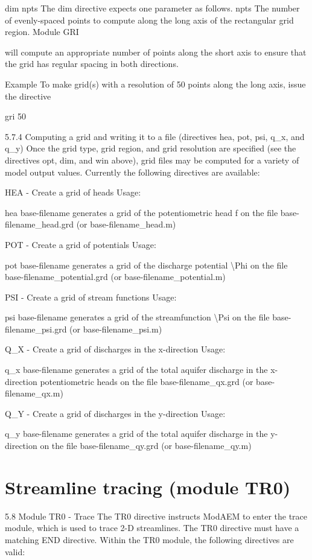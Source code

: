 dim npts The dim directive expects one parameter as follows. npts
The number of evenly-spaced points to compute along the long axis
of the rectangular grid region. Module GRI

will compute an appropriate number of points along the short axis
to ensure that the grid has regular spacing in both directions.

Example To make grid(s) with a resolution of 50 points along the long
axis, issue the directive

gri 50

5.7.4 Computing a grid and writing it to a file (directives hea, pot,
psi, q\_x, and q\_y) Once the grid type, grid region, and grid resolution
are specified (see the directives opt, dim, and win above), grid files
may be computed for a variety of model output values. Currently the
following directives are available:

HEA - Create a grid of heads Usage:

hea base-filename generates a grid of the potentiometric head f on
the file base-filename\_head.grd (or base-filename\_head.m)

POT - Create a grid of potentials Usage:

pot base-filename generates a grid of the discharge potential \textbackslash{}Phi
on the file base-filename\_potential.grd (or base-filename\_potential.m)

PSI - Create a grid of stream functions Usage:

psi base-filename generates a grid of the streamfunction \textbackslash{}Psi
on the file base-filename\_psi.grd (or base-filename\_psi.m)

Q\_X - Create a grid of discharges in the x-direction Usage:

q\_x base-filename generates a grid of the total aquifer discharge
in the x-direction potentiometric heads on the file base-filename\_qx.grd
(or base-filename\_qx.m)

Q\_Y - Create a grid of discharges in the y-direction Usage:

q\_y base-filename generates a grid of the total aquifer discharge
in the y-direction on the file base-filename\_qy.grd (or base-filename\_qy.m)


\section{Streamline tracing (module TR0)\label{sec:tr0-module}}

5.8 Module TR0 - Trace The TR0 directive instructs ModAEM to enter
the trace module, which is used to trace 2-D streamlines. The TR0
directive must have a matching END directive. Within the TR0 module,
the following directives are valid:

